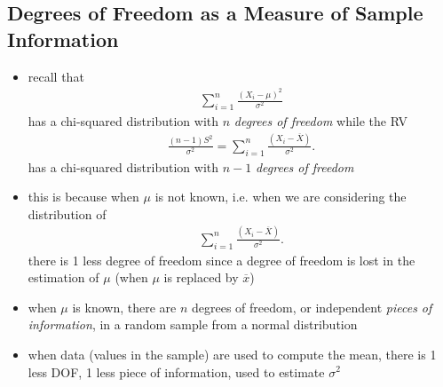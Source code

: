\documentclass[10pt]{article}
\begin{document}
\subsection{Degrees of Freedom as a Measure of Sample Information}
\begin{itemize}
    \item recall that
        \begin{gather*}
            \sum_{i=1}^{n} \frac{(X_i-\mu)^2}{\sigma^2}
        \end{gather*}
        has a chi-squared distribution with $n$ \textit{degrees of freedom} while the RV 
        \begin{gather*}
            \frac{(n-1)S^2}{\sigma^2} = \sum_{i=1}^{n} \frac{(X_i-\overline{X})}{\sigma^2}
        .\end{gather*}
        has a chi-squared distribution with $n-1$ \textit{degrees of freedom} 
    \item this is because when $\mu$ is not known, i.e. when we are considering the distribution of 
        \begin{gather*}
            \sum_{i=1}^{n} \frac{(X_i-\overline{X})}{\sigma^2}
        .\end{gather*}
        there is 1 less degree of freedom since a degree of freedom is lost in the estimation of $\mu$ (when $\mu$ is replaced by $\overline{x}$)
    \item when $\mu$ is known, there are $n$ degrees of freedom, or independent \textit{pieces of information}, in a random sample from a normal distribution
    \item when data (values in the sample) are used to compute the mean, there is 1 less DOF, 1 less piece of information, used to estimate $\sigma^2$
\end{itemize}
\end{document}
